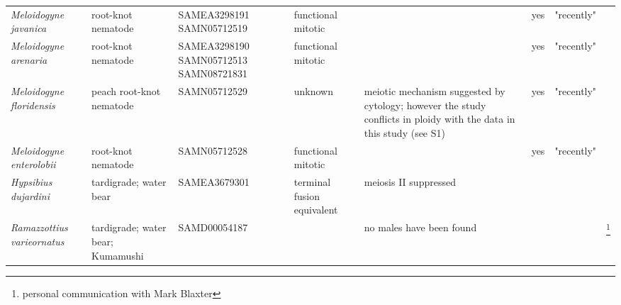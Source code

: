 \documentclass{article}
\begin{document}
\begin{longtable}[H]{ C{.13\textwidth} C{.1\textwidth} C{.12\textwidth} L{.13\textwidth} L{.199\textwidth} C{.04\textwidth} C{.082\textwidth} C{.062\textwidth}}
      \textit{Meloidogyne javanica} & root-knot nematode & SAMEA3298191 SAMN05712519 & functional mitotic & & yes & "recently" & \cite{Lunt2014} \\
      \textit{Meloidogyne arenaria} & root-knot nematode & SAMEA3298190 SAMN05712513 SAMN08721831 & functional mitotic & & yes & "recently" & \cite{Lunt2014} \\
      \textit{Meloidogyne floridensis} & peach root-knot nematode & SAMN05712529 & unknown & meiotic mechanism suggested by cytology; however the study conflicts in ploidy with the data in this study (see S1) & yes & "recently" & \cite{Handoo2004, Lunt2014} \\
      \textit{Meloidogyne enterolobii} & root-knot nematode & SAMN05712528 & functional mitotic & & yes & "recently" & \cite{Lunt2014}\\
      \hline
      \textit{Hypsibius dujardini} & tardigrade; water bear & SAMEA3679301 & terminal fusion equivalent & meiosis II suppressed & & & \cite{Ammermann1967} \\
      \textit{Ramazzottius varieornatus} & tardigrade; water bear; Kumamushi & SAMD00054187 & & no males have been found & & & \footnote{personal communication with Mark Blaxter} \\

    \end{longtable}

  \clearpage
  \newpage

  
  {}
\end{document}
